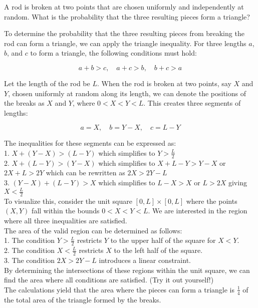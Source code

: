 \begin{exercise}
A rod is broken at two points that are chosen uniformly and independently at random. What is the probability that the three resulting pieces form a triangle?
\end{exercise}

\begin{solution}
To determine the probability that the three resulting pieces from breaking the rod can form a triangle, we can apply the triangle inequality. For three lengths \(a\), \(b\), and \(c\) to form a triangle, the following conditions must hold:

\[
a + b > c, \quad a + c > b, \quad b + c > a
\]

Let the length of the rod be \(L\). When the rod is broken at two points, say \(X\) and \(Y\), chosen uniformly at random along its length, we can denote the positions of the breaks as \(X\) and \(Y\), where \(0 < X < Y < L\). This creates three segments of lengths:

\[
a = X, \quad b = Y - X, \quad c = L - Y
\]

The inequalities for these segments can be expressed as:\\

1. \(X + (Y - X) > (L - Y)\) which simplifies to \(Y > \frac{L}{2}\)\\
2. \(X + (L - Y) > (Y - X)\) which simplifies to \(X + L - Y > Y - X\) or \(2X + L > 2Y\) which can be rewritten as \(2X > 2Y - L\)\\
3. \((Y - X) + (L - Y) > X\) which simplifies to \(L - X > X\) or \(L > 2X\) giving \(X < \frac{L}{2}\)\\

To visualize this, consider the unit square \( [0, L] \times [0, L] \) where the points \((X, Y)\) fall within the bounds \(0 < X < Y < L\). We are interested in the region where all three inequalities are satisfied.\\

The area of the valid region can be determined as follows:\\
1. The condition \(Y > \frac{L}{2}\) restricts \(Y\) to the upper half of the square for \(X < Y\).\\
2. The condition \(X < \frac{L}{2}\) restricts \(X\) to the left half of the square.\\
3. The condition \(2X > 2Y - L\) introduces a linear constraint.\\

By determining the intersections of these regions within the unit square, we can find the area where all conditions are satisfied. (Try it out yourself!)\\ 

The calculations yield that the area where the pieces can form a triangle is \(\frac{1}{4}\) of the total area of the triangle formed by the breaks.
\end{solution}

